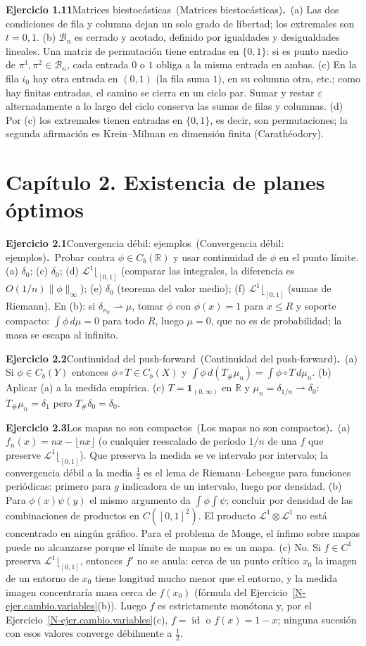 \documentclass[11pt,a4paper]{amsart}
\newcommand{\id}{\operatorname{id}}
\newcommand{\ve}{\varepsilon}
\newcommand{\R}{{\mathbb R}}
\newcommand{\B}{{\mathcal B}}
\newcommand{\LL}{{\mathcal L}}
\newcommand{\I}{{\mathbf 1}}
\theoremstyle{remark}
\theoremstyle{definition}
\numberwithin{subsection}{section}
\numberwithin{equation}{section}
\newcommand{\ejlabel}[2]{\par\medskip\noindent\textbf{Ejercicio #1}\ifx\relax#2\relax\else\ (#2)\fi\textbf{.}\ }
\begin{document}
\ejlabel{1.11}{Matrices biestocásticas}(a) Las dos condiciones de fila y columna dejan un solo grado de libertad; los extremales son $t=0,1$. (b) $\B_n$ es cerrado y acotado, definido por igualdades y desigualdades lineales. Una matriz de permutación tiene entradas en $\{0,1\}$: si es punto medio de $\pi^1,\pi^2\in\B_n$, cada entrada $0$ o $1$ obliga a la misma entrada en ambas. (c) En la fila $i_0$ hay otra entrada en $(0,1)$ (la fila suma $1$), en su columna otra, etc.; como hay finitas entradas, el camino se cierra en un ciclo par. Sumar y restar $\ve$ alternadamente a lo largo del ciclo conserva las sumas de filas y columnas. (d) Por (c) los extremales tienen entradas en $\{0,1\}$, es decir, son permutaciones; la segunda afirmación es Krein--Milman en dimensión finita (Carathéodory).

\section*{Capítulo 2. Existencia de planes óptimos}
\ejlabel{2.1}{Convergencia débil: ejemplos}Probar contra $\phi\in C_b(\R)$ y usar continuidad de $\phi$ en el punto límite. (a) $\delta_0$; (c) $\delta_0$; (d) $\LL^1\lfloor_{[0,1]}$ (comparar las integrales, la diferencia es $O(1/n)\|\phi\|_\infty$); (e) $\delta_0$ (teorema del valor medio); (f) $\LL^1\lfloor_{[0,1]}$ (sumas de Riemann). En (b): si $\delta_{n_k}\rightharpoonup\mu$, tomar $\phi$ con $\phi(x)=1$ para $x\le R$ y soporte compacto: $\int\phi\,d\mu=0$ para todo $R$, luego $\mu=0$, que no es de probabilidad; la masa se escapa al infinito.

\ejlabel{2.2}{Continuidad del push-forward}(a) Si $\phi\in C_b(Y)$ entonces $\phi\circ T\in C_b(X)$ y $\int\phi\,d(T_\#\mu_n)=\int\phi\circ T\,d\mu_n$. (b) Aplicar (a) a la medida empírica. (c) $T=\I_{(0,\infty)}$ en $\R$ y $\mu_n=\delta_{1/n}\rightharpoonup\delta_0$: $T_\#\mu_n=\delta_1$ pero $T_\#\delta_0=\delta_0$.

\ejlabel{2.3}{Los mapas no son compactos}(a) $f_n(x)=nx-\lfloor nx\rfloor$ (o cualquier reescalado de período $1/n$ de una $f$ que preserve $\LL^1\lfloor_{[0,1]}$). Que preserva la medida se ve intervalo por intervalo; la convergencia débil a la media $\frac12$ es el lema de Riemann--Lebesgue para funciones periódicas: primero para $g$ indicadora de un intervalo, luego por densidad. (b) Para $\phi(x)\psi(y)$ el mismo argumento da $\int\phi\int\psi$; concluir por densidad de las combinaciones de productos en $C([0,1]^2)$. El producto $\LL^1\otimes\LL^1$ no está concentrado en ningún gráfico. Para el problema de Monge, el ínfimo sobre mapas puede no alcanzarse porque el límite de mapas no es un mapa. (c) No. Si $f\in C^1$ preserva $\LL^1\lfloor_{[0,1]}$, entonces $f'$ no se anula: cerca de un punto crítico $x_0$ la imagen de un entorno de $x_0$ tiene longitud mucho menor que el entorno, y la medida imagen concentraría masa cerca de $f(x_0)$ (fórmula del Ejercicio~\ref{N-ejer.cambio.variables}(b)). Luego $f$ es estrictamente monótona y, por el Ejercicio~\ref{N-ejer.cambio.variables}(c), $f=\id$ o $f(x)=1-x$; ninguna sucesión con esos valores converge débilmente a $\frac12$.
\end{document}
